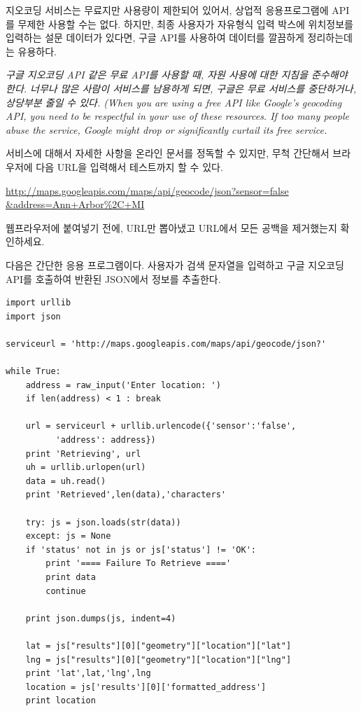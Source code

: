 지오코딩 서비스는 무료지만 사용량이 제한되어 있어서, 상업적 응용프로그램에 API를 무제한 사용할 수는 없다.
하지만, 최종 사용자가 자유형식 입력 박스에 위치정보를 입력하는 설문 데이터가 있다면,
구글 API를 사용하여 데이터를 깔끔하게 정리하는데는 유용하다.

{\em 구글 지오코딩 API 같은 무료 API를 사용할 때, 자원 사용에 대한 지침을 준수해야 한다.
너무나 많은 사람이 서비스를 남용하게 되면, 구글은 무료 서비스를 중단하거나, 상당부분 줄일 수 있다. 
(When you are using a free API like Google's geocoding API, you need
to be respectful in your use of these resources.  If too many people abuse the
service, Google might drop or significantly curtail its free service.}

서비스에 대해서 자세한 사항을 온라인 문서를 정독할 수 있지만, 
무척 간단해서 브라우저에 다음 URL을 입력해서 테스트까지 할 수 있다.

\url{http://maps.googleapis.com/maps/api/geocode/json?sensor=false &address=Ann+Arbor%2C+MI}

웹프라우저에 붙여넣기 전에, URL만 뽑아냈고 URL에서 모든 공백을 제거했는지 확인하세요.

다음은 간단한 응용 프로그램이다. 
사용자가 검색 문자열을 입력하고 구글 지오코딩 API를 호출하여 반환된 JSON에서 정보를 추출한다.

\beforeverb
\begin{verbatim}
import urllib
import json

serviceurl = 'http://maps.googleapis.com/maps/api/geocode/json?'

while True:
    address = raw_input('Enter location: ')
    if len(address) < 1 : break

    url = serviceurl + urllib.urlencode({'sensor':'false', 
          'address': address})
    print 'Retrieving', url
    uh = urllib.urlopen(url)
    data = uh.read()
    print 'Retrieved',len(data),'characters'

    try: js = json.loads(str(data))
    except: js = None
    if 'status' not in js or js['status'] != 'OK':
        print '==== Failure To Retrieve ===='
        print data
        continue

    print json.dumps(js, indent=4)

    lat = js["results"][0]["geometry"]["location"]["lat"]
    lng = js["results"][0]["geometry"]["location"]["lng"]
    print 'lat',lat,'lng',lng
    location = js['results'][0]['formatted_address']
    print location
\end{verbatim}
\afterverb
%

